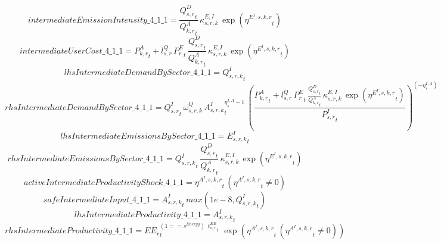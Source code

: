 \begin{dmath*}
intermediateEmissionIntensity\_4\_1\_1 = \frac{{{Q^{D}_{s,r}}}_{t}}{{{Q^{A}_{k,r}}}_{t}}\, {{\kappa^{E,I}_{s,r,k}}}\, \exp\left({{\eta^{E^{I},s,k,r}}}_{t}\right)
\end{dmath*}
\begin{dmath*}
intermediateUserCost\_4\_1\_1 = {{P^{A}_{k,r}}}_{t}+{{l^{Q}_{s,r}}}\, {{P^E_r}}_{t}\, \frac{{{Q^{D}_{s,r}}}_{t}}{{{Q^{A}_{k,r}}}_{t}}\, {{\kappa^{E,I}_{s,r,k}}}\, \exp\left({{\eta^{E^{I},s,k,r}}}_{t}\right)
\end{dmath*}
\begin{dmath*}
lhsIntermediateDemandBySector\_4\_1\_1 = {{Q^{I}_{s,r,k}}}_{t}
\end{dmath*}
\begin{dmath*}
rhsIntermediateDemandBySector\_4\_1\_1 = {{Q^{I}_{s,r}}}_{t}\, {{\omega^{Q}_{s,r,k}}}\, {{A^{I}_{s,r,k}}}_{t}^{{{\eta^{I,A}_{s}}}-1}\, \left(\frac{{{P^{A}_{k,r}}}_{t}+{{l^{Q}_{s,r}}}\, {{P^E_r}}_{t}\, \frac{{{Q^{D}_{s,r}}}_{t}}{{{Q^{A}_{k,r}}}_{t}}\, {{\kappa^{E,I}_{s,r,k}}}\, \exp\left({{\eta^{E^{I},s,k,r}}}_{t}\right)}{{{P^{I}_{s,r}}}_{t}}\right)^{\left(-{{\eta^{I,A}_{s}}}\right)}
\end{dmath*}
\begin{dmath*}
lhsIntermediateEmissionsBySector\_4\_1\_1 = {{E^I_{s,r,k}}}_{t}
\end{dmath*}
\begin{dmath*}
rhsIntermediateEmissionsBySector\_4\_1\_1 = {{Q^{I}_{s,r,k}}}_{t}\, \frac{{{Q^{D}_{s,r}}}_{t}}{{{Q^{A}_{k,r}}}_{t}}\, {{\kappa^{E,I}_{s,r,k}}}\, \exp\left({{\eta^{E^{I},s,k,r}}}_{t}\right)
\end{dmath*}
\begin{dmath*}
activeIntermediateProductivityShock\_4\_1\_1 = {{\eta^{A^{I},s,k,r}}}_{t}\, \left({{\eta^{A^{I},s,k,r}}}_{t}\neq 0\right)
\end{dmath*}
\begin{dmath*}
safeIntermediateInput\_4\_1\_1 = {{A^{I}_{s,r,k}}}_{t}\, max(1e-8,{{Q^{I}_{s,r,k}}}_{t})
\end{dmath*}
\begin{dmath*}
lhsIntermediateProductivity\_4\_1\_1 = {{A^{I}_{s,r,k}}}_{t}
\end{dmath*}
\begin{dmath*}
rhsIntermediateProductivity\_4\_1\_1 = {{EE_r}}_{t}^{\left(1=={{s^{Energy}}}\right)\, {{\ell^{EE}_{s,r}}}_{t}}\, \exp\left({{\eta^{A^{I},s,k,r}}}_{t}\, \left({{\eta^{A^{I},s,k,r}}}_{t}\neq 0\right)\right)
\end{dmath*}

